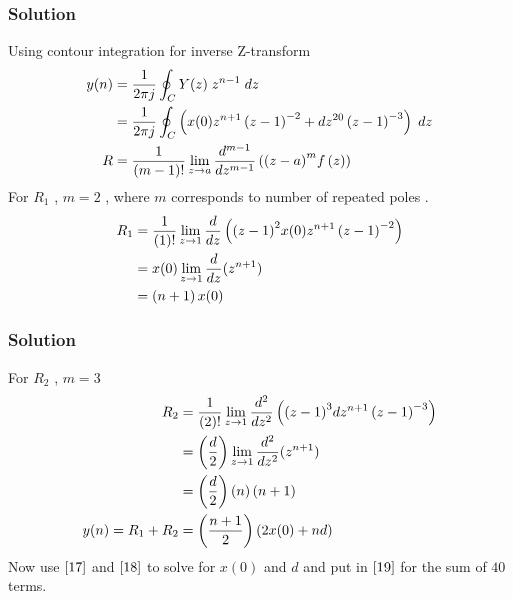 \documentclass{beamer}
\begin{document}
\begin{frame}
\frametitle{Solution}
Using contour integration for inverse Z-transform
\begin{align}
    y(n)&=\frac{1}{2\pi j}\oint_{C}Y(z) \;z^{n-1} \;dz\\  
 &=\frac{1}{2\pi j}\oint_{C}\left(x(0)z^{n+1}\left(z-1\right)^{-2}+
       dz^{20}\left(z-1\right)^{-3}\right) \;dz\\
       R&=\frac{1}{\left(m-1\right)!}\lim\limits_{z\to a}\frac{d^{m-1}}{dz^{m-1}}\left({(z-a)}^{m}f\left(z\right)\right)
\end{align}
For $R_1$ , $m=2$ , where $m$ corresponds to number of repeated poles .
\begin{align}
    R_1 &=\frac{1}{\left(1\right)!}\lim\limits_{z\to 1}\frac{d}{dz}\left({(z-1)}^{2}x(0)z^{n+1}\left(z-1\right)^{-2}\right)   \\
    &=x(0)\lim\limits_{z\to 1}\frac{d}{dz}(z^{n+1})   \\
    &= \left(n+1\right)x(0)
    \end{align}
\end{frame}












\begin{frame}
\frametitle{Solution}
   For $R_2$ , $m=3$ 
    \begin{align}
    R_2 &=\frac{1}{\left(2\right)!}\lim\limits_{z\to 1}\frac{d^{2}}{dz^{2}}\left({(z-1)}^{3}dz^{n+1}\left(z-1\right)^{-3}\right)   \\
        &=\left(\frac{d}{2}\right)\lim\limits_{z\to 1}\frac{d^2}{dz^2}(z^{n+1})   \\
    &= \left(\frac{d}{2}\right)\left(n\right)\left(n+1\right)\\
   y(n)= R_1 + R_2 &= \left(\frac{n+1}{2}\right)\left(2x(0) + nd\right) \label{19}
\end{align}
Now use $\eqref{17}$ and $\eqref{18}$ to solve for $x(0)$ and $d$ and put in $\eqref{19}$ for the sum of $40$ terms.
\end{frame} 
\end{document}
